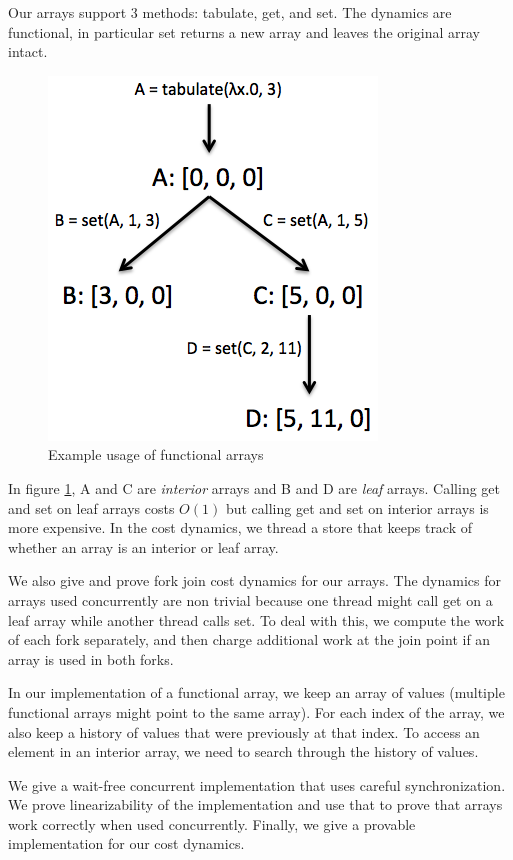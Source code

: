 \documentclass[preprint]{sigplanconf}
\begin{document}
Our arrays support 3 methods: tabulate, get, and set. The dynamics are functional, in particular set returns a new array and leaves the original array intact.

\begin{figure}[!ht]
\centering
\includegraphics[scale=0.5]{leaf_interior_intro}
\nocaptionrule \caption{Example usage of functional arrays}
\label{fig:leaf_interior_intro}
\end{figure}

In figure \ref{fig:leaf_interior_intro}, A and C are \emph{interior} arrays and B and D are \emph{leaf} arrays. Calling get and set on leaf arrays costs $O(1)$ but calling get and set on interior arrays is more expensive. In the cost dynamics, we thread a store that keeps track of whether an array is an interior or leaf array.

We also give and prove fork join cost dynamics for our arrays. The dynamics for arrays used concurrently are non trivial because one thread might call get on a leaf array while another thread calls set. To deal with this, we compute the work of each fork separately, and then charge additional work at the join point if an array is used in both forks.

In our implementation of a functional array, we keep an array of values (multiple functional arrays might point to the same array). For each index of the array, we also keep a history of values that were previously at that index. To access an element in an interior array, we need to search through the history of values.

We give a wait-free concurrent implementation that uses careful synchronization. We prove linearizability of the implementation and use that to prove that arrays work correctly when used concurrently. Finally, we give a provable implementation for our cost dynamics.
\end{document}
